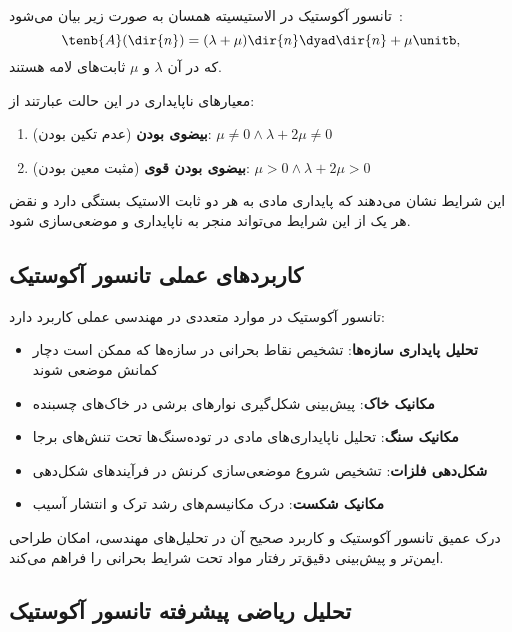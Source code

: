\begin{example}
    تانسور آکوستیک در الاستیسیته همسان به صورت زیر بیان می‌شود~\autocite{Bigoni.2012}:
    \begin{equation}
        \tenb{A}(\dir{n}) =  (\lambda+\mu)  \dir{n}\dyad \dir{n} + \mu\unitb,
    \end{equation}
    که در آن $\lambda$ و $\mu$ ثابت‌های لامه هستند.

    معیارهای ناپایداری در این حالت عبارتند از:
    \begin{enumerate}
        \item \textbf{بیضوی بودن} (عدم تکین بودن): $\mu\neq 0 \wedge \lambda+2\mu\neq0$
        \item \textbf{بیضوی بودن قوی} (مثبت معین بودن): $\mu> 0 \wedge \lambda+2\mu>0$
    \end{enumerate}

    این شرایط نشان می‌دهند که پایداری مادی به هر دو ثابت الاستیک بستگی دارد و نقض هر یک از این شرایط می‌تواند منجر به ناپایداری و موضعی‌سازی شود.
\end{example}

\subsection{کاربردهای عملی تانسور آکوستیک}
تانسور آکوستیک در موارد متعددی در مهندسی عملی کاربرد دارد:

\begin{itemize}
    \item \textbf{تحلیل پایداری سازه‌ها}: تشخیص نقاط بحرانی در سازه‌ها که ممکن است دچار کمانش موضعی شوند
    \item \textbf{مکانیک خاک}: پیش‌بینی شکل‌گیری نوارهای برشی در خاک‌های چسبنده
    \item \textbf{مکانیک سنگ}: تحلیل ناپایداری‌های مادی در توده‌سنگ‌ها تحت تنش‌های برجا
    \item \textbf{شکل‌دهی فلزات}: تشخیص شروع موضعی‌سازی کرنش در فرآیندهای شکل‌دهی
    \item \textbf{مکانیک شکست}: درک مکانیسم‌های رشد ترک و انتشار آسیب
\end{itemize}

درک عمیق تانسور آکوستیک و کاربرد صحیح آن در تحلیل‌های مهندسی، امکان طراحی ایمن‌تر و پیش‌بینی دقیق‌تر رفتار مواد تحت شرایط بحرانی را فراهم می‌کند.

\subsection{تحلیل ریاضی پیشرفته تانسور آکوستیک}

